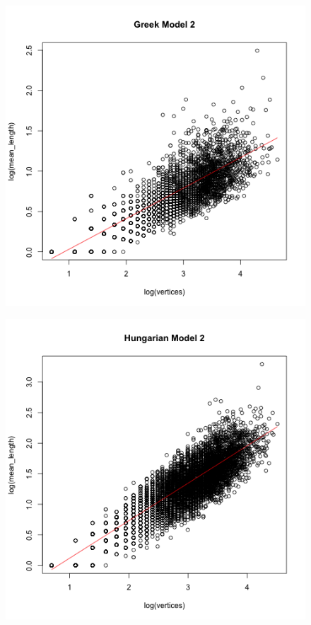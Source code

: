 \documentclass[paper=a4, fontsize=11pt]{scrartcl} %
\begin{document}
\begin{figure}
\begin{minipage}{.5\textwidth}
  \label{fig:6}
\end{minipage}
\end{figure}

\begin{figure}
\centering
\begin{minipage}{.5\textwidth}
  \centering
  \includegraphics[width=\linewidth]{bestModel_Greek.png}
  \label{fig:7}
\end{minipage}%
\begin{minipage}{.5\textwidth}
  \centering
  \includegraphics[width=\linewidth]{bestModel_Hungarian.png}

\end{minipage}
\end{figure}
\end{document}
